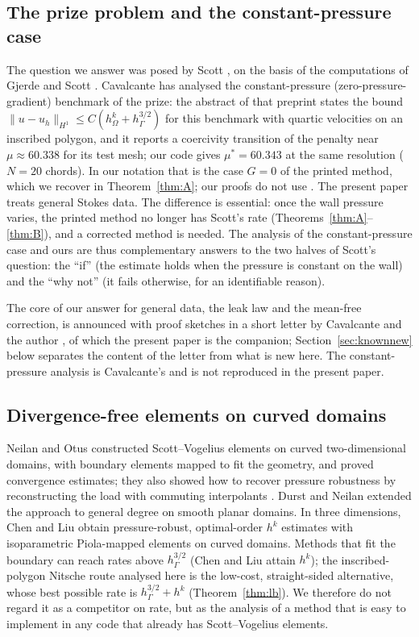 \documentclass[pdflatex,sn-mathphys-num]{sn-jnl}
\theoremstyle{thmstyleone}
\theoremstyle{thmstylethree}
\newcommand{\hG}{h_\Gamma}
\newcommand{\hO}{h_\Omega}
\newcommand{\norm}[1]{\lVert #1\rVert}
\begin{document}
\subsection{The prize problem and the constant-pressure case}
The question we answer was posed by Scott \cite{ScottPrize}, on the basis of the computations of Gjerde and Scott \cite{GjerdeScott2024}. Cavalcante \cite{Cavalcante} has analysed the constant-pressure (zero-pressure-gradient) benchmark of the prize: the abstract of that preprint states the bound $\norm{u-u_h}_{H^1}\le C(\hO^k+\hG^{3/2})$ for this benchmark with quartic velocities on an inscribed polygon, and it reports a coercivity transition of the penalty near $\mu\approx60.338$ for its test mesh; our code gives $\mu^\ast=60.343$ at the same resolution ($N=20$ chords). In our notation that is the case $G=0$ of the printed method, which we recover in Theorem~\ref{thm:A}; our proofs do not use \cite{Cavalcante}. The present paper treats general Stokes data. The difference is essential: once the wall pressure varies, the printed method no longer has Scott's rate (Theorems~\ref{thm:A}--\ref{thm:B}), and a corrected method is needed. The analysis of the constant-pressure case and ours are thus complementary answers to the two halves of Scott's question: the ``if'' (the estimate holds when the pressure is constant on the wall) and the ``why not'' (it fails otherwise, for an identifiable reason).

The core of our answer for general data, the leak law and the mean-free correction, is announced with proof sketches in a short letter by Cavalcante and the author \cite{CavalcantePadhiLetter}, of which the present paper is the companion; Section~\ref{sec:knownnew} below separates the content of the letter from what is new here. The constant-pressure analysis is Cavalcante's \cite{Cavalcante} and is not reproduced in the present paper.

\subsection{Divergence-free elements on curved domains}
Neilan and Otus \cite{NeilanOtus2021} constructed Scott--Vogelius elements on curved two-dimensional domains, with boundary elements mapped to fit the geometry, and proved convergence estimates; they also showed how to recover pressure robustness by reconstructing the load with commuting interpolants \cite[Theorem~6.1]{NeilanOtus2021}. Durst and Neilan \cite{DurstNeilan2024} extended the approach to general degree on smooth planar domains. In three dimensions, Chen and Liu \cite{ChenLiu2026} obtain pressure-robust, optimal-order $h^k$ estimates with isoparametric Piola-mapped elements on curved domains. Methods that fit the boundary can reach rates above $\hG^{3/2}$ (Chen and Liu attain $h^k$); the inscribed-polygon Nitsche route analysed here is the low-cost, straight-sided alternative, whose best possible rate is $\hG^{3/2}+h^k$ (Theorem~\ref{thm:lb}). We therefore do not regard it as a competitor on rate, but as the analysis of a method that is easy to implement in any code that already has Scott--Vogelius elements.
\end{document}
